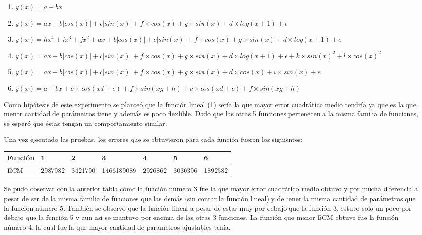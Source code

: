 \begin{enumerate}
  \item $y(x) = a + bx$
  \item $y(x) = ax + b|cos(x)| + c|sin(x)| + f  \times  cos(x) + g  \times  sin(x) + d  \times  log(x+1) + e$
  \item $y(x) = hx^4 + ix^3 + jx^2 + ax + b|cos(x)| + c|sin(x)| + f  \times  cos(x) + g  \times  sin(x) + d  \times  log(x+1) + e$
  \item $y(x) = ax + b|cos(x)| + c|sin(x)| + f  \times  cos(x) + g  \times  sin(x) + d  \times  log(x+1) + e + k  \times  sin(x) ^ 2 + l  \times  cos(x) ^ 2$
  \item $y(x) = ax + b|cos(x)| + c|sin(x)| + f  \times  cos(x) + g  \times  sin(x) + d  \times  cos(x) + i  \times  sin(x)  + e$
  \item $y(x) = a + bx + c  \times  cos(xd + e) + f  \times  sin(xg + h) + c  \times  cos(xd + e) + f  \times  sin(xg + h)$
\end{enumerate}


Como hipótesis de este experimento se planteó que la función lineal (1) sería la que mayor error cuadrático medio tendría ya que es la que menor cantidad de parámetros tiene y además es poco flexlible. Dado que las otras 5 funciones pertenecen a la misma familia de funciones, se esperó que éstas tengan un comportamiento similar.

Una vez ejecutado las pruebas, los errores que se obtuvieron para cada función fueron los siguientes:


\begin{tabular}{ | l | l | l | l | l | l | l | }
  \hline			
  Función & 1 & 2 & 3 & 4 & 5 & 6 \\
  \hline
  ECM & 2987982 & 3421790 & 1466189089 & 2926862 & 3030396 & 1892582  \\
  \hline
\end{tabular}

Se pudo observar con la anterior tabla cómo la función número 3 fue la que mayor error cuadrático medio obtuvo y por mucha diferencia a pesar de ser de la misma familia de funciones que las demás (sin contar la función lineal) y de tener la misma cantidad de parámetros que la función número 5. También se observó que la función lineal a pesar de estar muy por debajo que la función 3, estuvo solo un poco por debajo que la función 5 y aun así se mantuvo por encima de las otras 3 funciones.
La función que menor ECM obtuvo fue la función número 4, la cual fue la que mayor cantidad de parametros ajustables tenía.
